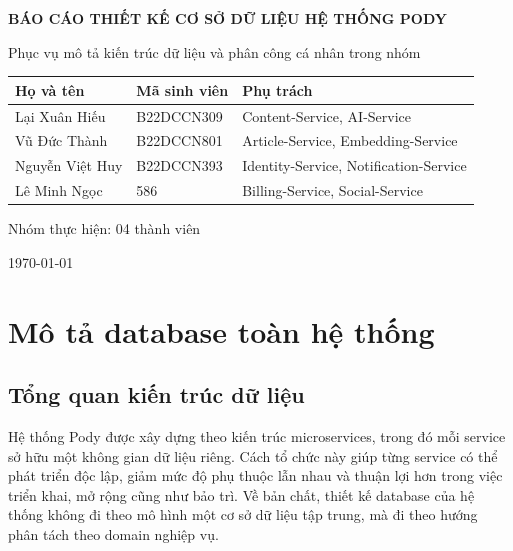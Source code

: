 \documentclass[12pt,a4paper]{report}
\begin{document}
\begin{titlepage}
\centering

{\Large \textbf{BÁO CÁO THIẾT KẾ CƠ SỞ DỮ LIỆU HỆ THỐNG PODY}\par}
\vspace{1cm}
{\large Phục vụ mô tả kiến trúc dữ liệu và phân công cá nhân trong nhóm\par}
\vspace{2cm}

\begin{tabular}{|p{5.2cm}|p{4.2cm}|p{4cm}|}
\hline
\textbf{Họ và tên} & \textbf{Mã sinh viên} & \textbf{Phụ trách} \\
\hline
Lại Xuân Hiếu & B22DCCN309 & Content-Service, AI-Service \\
\hline
Vũ Đức Thành & B22DCCN801 & Article-Service, Embedding-Service \\
\hline
Nguyễn Việt Huy & B22DCCN393 & Identity-Service, Notification-Service \\
\hline
Lê Minh Ngọc & 586 & Billing-Service, Social-Service \\
\hline
\end{tabular}

\vfill

{\large Nhóm thực hiện: 04 thành viên\par}
\vspace{0.5cm}
{\large \today\par}

\end{titlepage}

\tableofcontents
\clearpage

\chapter{Mô tả database toàn hệ thống}

\section{Tổng quan kiến trúc dữ liệu}

Hệ thống Pody được xây dựng theo kiến trúc microservices, trong đó mỗi service sở hữu một không gian dữ liệu riêng. Cách tổ chức này giúp từng service có thể phát triển độc lập, giảm mức độ phụ thuộc lẫn nhau và thuận lợi hơn trong việc triển khai, mở rộng cũng như bảo trì. Về bản chất, thiết kế database của hệ thống không đi theo mô hình một cơ sở dữ liệu tập trung, mà đi theo hướng phân tách theo domain nghiệp vụ.
\end{document}
